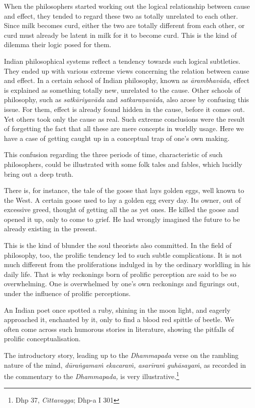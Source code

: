 When the philosophers started working out the logical relationship between cause and effect, they tended to regard these two as totally unrelated to each other. Since milk becomes curd, either the two are totally different from each other, or curd must already be latent in milk for it to become curd. This is the kind of dilemma their logic posed for them.

Indian philosophical systems reflect a tendency towards such logical subtleties. They ended up with various extreme views concerning the relation between cause and effect. In a certain school of Indian philosophy, known as \emph{ārambhavāda}, effect is explained as something totally new, unrelated to the cause. Other schools of philosophy, such as \emph{satkāriyavāda} and \emph{satkaraṇavāda}, also arose by confusing this issue. For them, effect is already found hidden in the cause, before it comes out. Yet others took only the cause as real. Such extreme conclusions were the result of forgetting the fact that all these are mere concepts in worldly usage. Here we have a case of getting caught up in a conceptual trap of one's own making.

This confusion regarding the three periods of time, characteristic of such philosophers, could be illustrated with some folk tales and fables, which lucidly bring out a deep truth.

There is, for instance, the tale of the goose that lays golden eggs, well known to the West. A certain goose used to lay a golden egg every day. Its owner, out of excessive greed, thought of getting all the as yet ones. He killed the goose and opened it up, only to come to grief. He had wrongly imagined the future to be already existing in the present.

This is the kind of blunder the soul theorists also committed. In the field of philosophy, too, the prolific tendency led to such subtle complications. It is not much different from the proliferations indulged in by the ordinary worldling in his daily life. That is why reckonings born of prolific perception are said to be so overwhelming. One is overwhelmed by one's own reckonings and figurings out, under the influence of prolific perceptions.

An Indian poet once spotted a ruby, shining in the moon light, and eagerly approached it, enchanted by it, only to find a blood red spittle of beetle. We often come across such humorous stories in literature, showing the pitfalls of prolific conceptualisation.

The introductory story, leading up to the \emph{Dhammapada} verse on the rambling nature of the mind, \emph{dūraṅgamaṁ ekacaraṁ, asarīraṁ guhāsayaṁ}, as recorded in the commentary to the \emph{Dhammapada,} is very illustrative.\footnote{Dhp 37, \emph{Cittavagga}; Dhp-a I 301}

